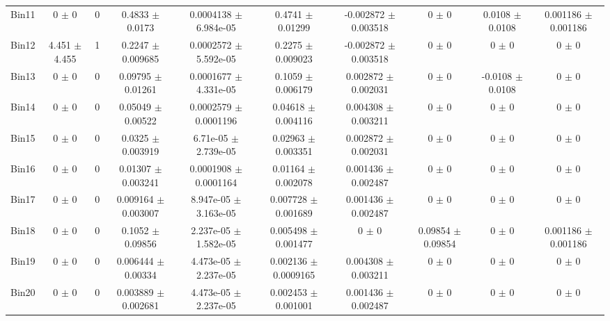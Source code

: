 \begin{tabular}{@{\extracolsep{4pt}}lccccccccc@{}}
     Bin11 & 0 $\pm$ 0 & 0 & 0.4833 $\pm$ 0.0173 & 0.0004138 $\pm$ 6.984e-05 & 0.4741 $\pm$ 0.01299 & -0.002872 $\pm$ 0.003518 & 0 $\pm$ 0 & 0.0108 $\pm$ 0.0108 & 0.001186 $\pm$ 0.001186 \\ 
     Bin12 & 4.451 $\pm$ 4.455 & 1 & 0.2247 $\pm$ 0.009685 & 0.0002572 $\pm$ 5.592e-05 & 0.2275 $\pm$ 0.009023 & -0.002872 $\pm$ 0.003518 & 0 $\pm$ 0 & 0 $\pm$ 0 & 0 $\pm$ 0 \\ 
     Bin13 & 0 $\pm$ 0 & 0 & 0.09795 $\pm$ 0.01261 & 0.0001677 $\pm$ 4.331e-05 & 0.1059 $\pm$ 0.006179 & 0.002872 $\pm$ 0.002031 & 0 $\pm$ 0 & -0.0108 $\pm$ 0.0108 & 0 $\pm$ 0 \\ 
     Bin14 & 0 $\pm$ 0 & 0 & 0.05049 $\pm$ 0.00522 & 0.0002579 $\pm$ 0.0001196 & 0.04618 $\pm$ 0.004116 & 0.004308 $\pm$ 0.003211 & 0 $\pm$ 0 & 0 $\pm$ 0 & 0 $\pm$ 0 \\ 
     Bin15 & 0 $\pm$ 0 & 0 & 0.0325 $\pm$ 0.003919 & 6.71e-05 $\pm$ 2.739e-05 & 0.02963 $\pm$ 0.003351 & 0.002872 $\pm$ 0.002031 & 0 $\pm$ 0 & 0 $\pm$ 0 & 0 $\pm$ 0 \\ 
     Bin16 & 0 $\pm$ 0 & 0 & 0.01307 $\pm$ 0.003241 & 0.0001908 $\pm$ 0.0001164 & 0.01164 $\pm$ 0.002078 & 0.001436 $\pm$ 0.002487 & 0 $\pm$ 0 & 0 $\pm$ 0 & 0 $\pm$ 0 \\ 
     Bin17 & 0 $\pm$ 0 & 0 & 0.009164 $\pm$ 0.003007 & 8.947e-05 $\pm$ 3.163e-05 & 0.007728 $\pm$ 0.001689 & 0.001436 $\pm$ 0.002487 & 0 $\pm$ 0 & 0 $\pm$ 0 & 0 $\pm$ 0 \\ 
     Bin18 & 0 $\pm$ 0 & 0 & 0.1052 $\pm$ 0.09856 & 2.237e-05 $\pm$ 1.582e-05 & 0.005498 $\pm$ 0.001477 & 0 $\pm$ 0 & 0.09854 $\pm$ 0.09854 & 0 $\pm$ 0 & 0.001186 $\pm$ 0.001186 \\ 
     Bin19 & 0 $\pm$ 0 & 0 & 0.006444 $\pm$ 0.00334 & 4.473e-05 $\pm$ 2.237e-05 & 0.002136 $\pm$ 0.0009165 & 0.004308 $\pm$ 0.003211 & 0 $\pm$ 0 & 0 $\pm$ 0 & 0 $\pm$ 0 \\ 
     Bin20 & 0 $\pm$ 0 & 0 & 0.003889 $\pm$ 0.002681 & 4.473e-05 $\pm$ 2.237e-05 & 0.002453 $\pm$ 0.001001 & 0.001436 $\pm$ 0.002487 & 0 $\pm$ 0 & 0 $\pm$ 0 & 0 $\pm$ 0 \\ 
\hline\hline
  \end{tabular}
